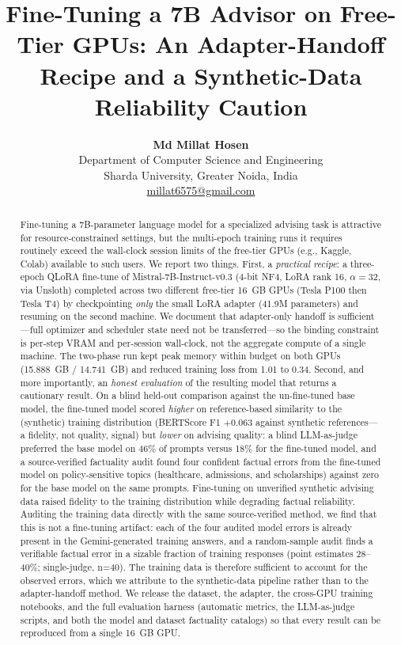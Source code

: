 \documentclass[11pt, a4paper]{article}
\title{\textbf{Fine-Tuning a 7B Advisor on Free-Tier GPUs: An Adapter-Handoff Recipe and a Synthetic-Data Reliability Caution}}
\author{
    \textbf{Md Millat Hosen} \\
    Department of Computer Science and Engineering \\
    Sharda University, Greater Noida, India \\
    \href{mailto:millat6575@gmail.com}{millat6575@gmail.com}
}
\date{}
\begin{document}
\maketitle

\begin{abstract}
Fine-tuning a 7B-parameter language model for a specialized advising task is attractive for resource-constrained settings, but the multi-epoch training runs it requires routinely exceed the wall-clock session limits of the free-tier GPUs (e.g., Kaggle, Colab) available to such users. We report two things. First, a \emph{practical recipe}: a three-epoch QLoRA fine-tune of Mistral-7B-Instruct-v0.3 (4-bit NF4, LoRA rank 16, $\alpha=32$, via Unsloth) completed across two different free-tier 16~GB GPUs (Tesla P100 then Tesla T4) by checkpointing \emph{only} the small LoRA adapter (41.9M parameters) and resuming on the second machine. We document that adapter-only handoff is sufficient---full optimizer and scheduler state need not be transferred---so the binding constraint is per-step VRAM and per-session wall-clock, not the aggregate compute of a single machine. The two-phase run kept peak memory within budget on both GPUs (15.888~GB / 14.741~GB) and reduced training loss from 1.01 to 0.34. Second, and more importantly, an \emph{honest evaluation} of the resulting model that returns a cautionary result. On a blind held-out comparison against the un-fine-tuned base model, the fine-tuned model scored \emph{higher} on reference-based similarity to the (synthetic) training distribution (BERTScore F1 $+0.063$ against synthetic references---a fidelity, not quality, signal) but \emph{lower} on advising quality: a blind LLM-as-judge preferred the base model on 46\% of prompts versus 18\% for the fine-tuned model, and a source-verified factuality audit found four confident factual errors from the fine-tuned model on policy-sensitive topics (healthcare, admissions, and scholarships) against zero for the base model on the same prompts. Fine-tuning on unverified synthetic advising data raised fidelity to the training distribution while degrading factual reliability. Auditing the training data directly with the same source-verified method, we find that this is not a fine-tuning artifact: each of the four audited model errors is already present in the Gemini-generated training answers, and a random-sample audit finds a verifiable factual error in a sizable fraction of training responses (point estimates 28--40\%; single-judge, n=40). The training data is therefore sufficient to account for the observed errors, which we attribute to the synthetic-data pipeline rather than to the adapter-handoff method. We release the dataset, the adapter, the cross-GPU training notebooks, and the full evaluation harness (automatic metrics, the LLM-as-judge scripts, and both the model and dataset factuality catalogs) so that every result can be reproduced from a single 16~GB GPU.
\end{abstract}
\end{document}
